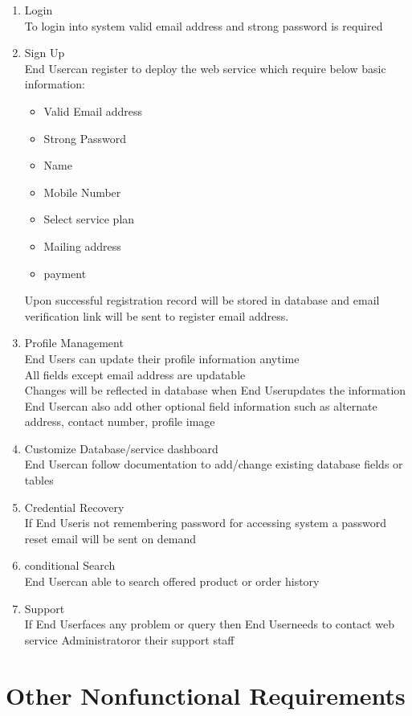 \documentclass{scrreprt}
\newcommand*\arrow{\item[$\Rightarrow$]}
\def\admin{Administrator}
\def\user{End User}
\begin{document}
\begin{enumerate}[start=1,label={\bfseries REQ \arabic*:}]
	\addtolength{\itemindent}{40pt}
	\item Login
		\\To login into system valid email address and strong password is required
	\item Sign Up
		\\ \user \space can register to deploy the web service which require below basic information:
			\begin{itemize}
				\arrow Valid Email address
				\arrow Strong Password
				\arrow Name
				\arrow Mobile Number
				\arrow Select service plan
				\arrow Mailing address
				\arrow payment
			\end{itemize}
		Upon successful registration record will be stored in database and email verification link will be sent to register email address.
	\item Profile Management
		\\ \user s can update their profile information anytime
		\\All fields except email address are updatable
		\\Changes will be reflected in database when \user \space updates the information
		\\ \user can also add other optional field information such as alternate address, contact number, profile image
	\item Customize Database/service dashboard
		\\ \user \space can follow documentation to add/change existing database fields or tables
	\item Credential Recovery
		\\If \user \space is not remembering password for accessing system a password reset email will be sent on demand
	\item conditional Search
		\\ \user \space can able to search offered product or order history
	\item Support
		\\If \user \space faces any problem or query then \user \space needs to contact web service \admin \space or their support staff
\end{enumerate}

\chapter{Other Nonfunctional Requirements}
\end{document}
